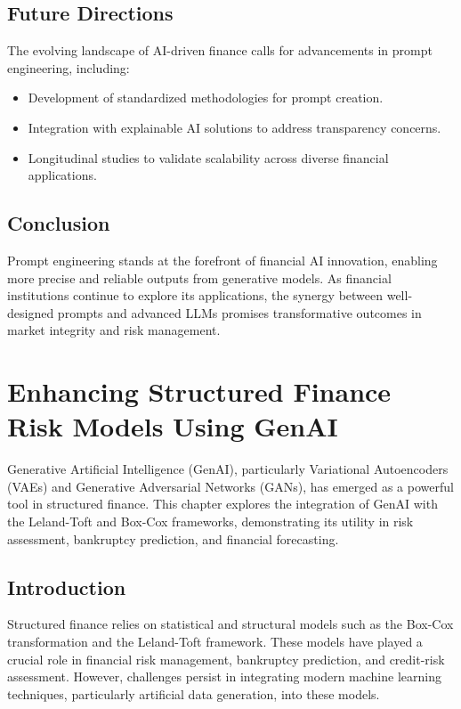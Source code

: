 \documentclass[a4paper,headinclude=on,footinclude=on,12pt,oneside]{scrbook}
\begin{document}
\section{Future Directions}
The evolving landscape of AI-driven finance calls for advancements in prompt engineering, including:
\begin{itemize}
	\item Development of standardized methodologies for prompt creation.
	\item Integration with explainable AI solutions to address transparency concerns.
	\item Longitudinal studies to validate scalability across diverse financial applications.
\end{itemize}

\section{Conclusion}
Prompt engineering stands at the forefront of financial AI innovation, enabling more precise and reliable outputs from generative models. As financial institutions continue to explore its applications, the synergy between well-designed prompts and advanced LLMs promises transformative outcomes in market integrity and risk management.



\chapter{Enhancing Structured Finance Risk Models Using GenAI}


Generative Artificial Intelligence (GenAI), particularly Variational Autoencoders (VAEs) and Generative Adversarial Networks (GANs), has emerged as a powerful tool in structured finance. This chapter explores the integration of GenAI with the Leland-Toft and Box-Cox frameworks, demonstrating its utility in risk assessment, bankruptcy prediction, and financial forecasting.

\section{Introduction}
Structured finance relies on statistical and structural models such as the Box-Cox transformation and the Leland-Toft framework. These models have played a crucial role in financial risk management, bankruptcy prediction, and credit-risk assessment. However, challenges persist in integrating modern machine learning techniques, particularly artificial data generation, into these models. 
\end{document}
